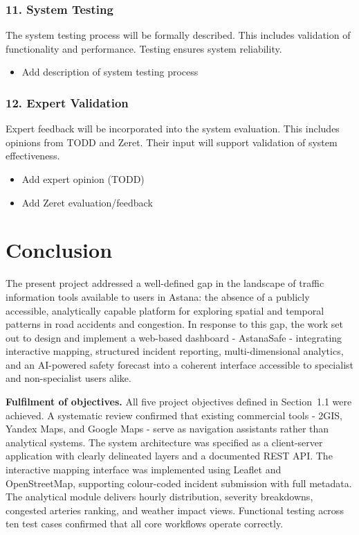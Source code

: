 \documentclass[12pt,a4paper]{report}
\begin{document}
\subsection*{11. System Testing}
The system testing process will be formally described. This includes validation of functionality and performance. Testing ensures system reliability.

\begin{itemize}
    \item Add description of system testing process
\end{itemize}

\subsection*{12. Expert Validation}
Expert feedback will be incorporated into the system evaluation. This includes opinions from TODD and Zeret. Their input will support validation of system effectiveness.

\begin{itemize}
    \item Add expert opinion (TODD)
    \item Add Zeret evaluation/feedback
\end{itemize}

\chapter*{Conclusion}

The present project addressed a well-defined gap in the landscape of traffic
information tools available to users in Astana: the absence of a publicly accessible,
analytically capable platform for exploring spatial and temporal patterns in road
accidents and congestion. In response to this gap, the work set out to design and
implement a web-based dashboard - AstanaSafe - integrating interactive mapping,
structured incident reporting, multi-dimensional analytics, and an AI-powered safety
forecast into a coherent interface accessible to specialist and non-specialist users
alike.
 
\textbf{Fulfilment of objectives.} All five project objectives defined in Section~1.1 were achieved. A systematic review confirmed that existing commercial tools - 2GIS, Yandex Maps, and Google Maps - serve as navigation assistants rather than analytical systems. The system architecture was specified as a client-server application with clearly delineated layers and a documented REST API. The interactive mapping interface was implemented using Leaflet and OpenStreetMap, supporting colour-coded incident submission with full metadata. The analytical module delivers hourly distribution, severity breakdowns, congested arteries ranking, and weather impact views. Functional testing across ten test cases confirmed that all core workflows operate correctly.
\end{document}

